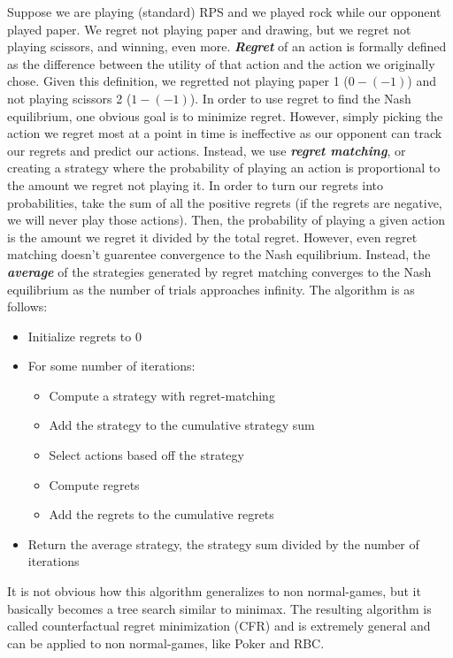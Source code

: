 \documentclass[11pt, oneside]{article}
\newcommand{\emphasis}[1]{\textbf{\textit{#1}}}
\begin{document}
Suppose we are playing (standard) RPS and we played rock while our opponent played paper.
We regret not playing paper and drawing, but we regret not playing scissors, and winning, even more.
\emphasis{Regret} of an action is formally defined as the difference
between the utility of that action and the action we originally chose.
Given this definition, we regretted not playing paper 1 (\( 0 - (-1) \)) and
not playing scissors 2 (\( 1 - (-1) \)).
In order to use regret to find the Nash equilibrium, one obvious goal
is to minimize regret.
However, simply picking the action we regret most at a point in time
is ineffective as our opponent can track our regrets and predict our actions.
Instead, we use \emphasis{regret matching},
or creating a strategy where the probability of playing an action
is proportional to the amount we regret not playing it.
In order to turn our regrets into probabilities, take the sum of all the positive regrets
(if the regrets are negative, we will never play those actions).
Then, the probability of playing a given action is the amount we regret it divided by the total regret.
However, even regret matching doesn't guarentee convergence to the Nash equilibrium.
Instead, the \emphasis{average} of the strategies generated by regret matching
converges to the Nash equilibrium as the number of trials approaches infinity.
The algorithm is as follows:

\begin{itemize}
  \item Initialize regrets to 0
  \item For some number of iterations:
  \begin{itemize}
    \item Compute a strategy with regret-matching
    \item Add the strategy to the cumulative strategy sum
    \item Select actions based off the strategy
    \item Compute regrets
    \item Add the regrets to the cumulative regrets
  \end{itemize}
  \item Return the average strategy, the strategy sum divided by the number of iterations
\end{itemize}

It is not obvious how this algorithm generalizes to non normal-games,
but it basically becomes a tree search similar to minimax.
The resulting algorithm is called counterfactual regret minimization (CFR) and
is extremely general and can be applied to non normal-games,
like Poker and RBC.
\end{document}

